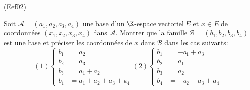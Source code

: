 \begin{tiny}(Eef02)\end{tiny} Soit $\mathcal{A}=(a_1,a_2,a_3,a_4)$ une base d'un $\K$-espace vectoriel $E$ et $x\in E$ de coordonnées $(x_1,x_2,x_3,x_4)$ dans $\mathcal{A}$. Montrer que la famille $\mathcal{B}=(b_1,b_2,b_3,b_4)$ est une base et préciser les coordonnées de $x$ dans $\mathcal{B}$ dans les cas suivants:
\[
 (1)
 \left\lbrace 
 \begin{aligned}
  b_1 &= a_2 \\ b_2 &= a_3 \\ b_3 &= a_1 + a_2 \\ b_4 &= a_1 + a_2 + a_3 + a_4
 \end{aligned}
\right. 
 (2)
 \left\lbrace 
 \begin{aligned}
  b_1 &= -a_1 + a_3 \\ b_2 &= a_1 \\ b_3 &= a_2 \\ b_4 &= -a_2 - a_3 + a_4
 \end{aligned}
\right. 
\]
